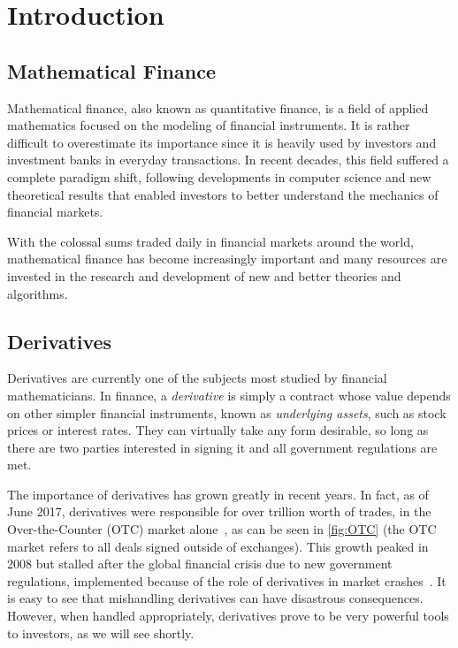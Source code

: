 \chapter{Introduction}
\label{chapter:introduction}
\section{Mathematical Finance}
\label{section:mathematical finance}
Mathematical finance, also known as quantitative finance, is a field of applied mathematics focused on the modeling of financial instruments.
It is rather difficult to overestimate its importance since it is heavily used by investors and investment banks in everyday transactions.
In recent decades, this field suffered a complete paradigm shift, following developments in computer science and new theoretical results that enabled investors to better understand the mechanics of financial markets.

With the colossal sums traded daily in financial markets around the world, mathematical finance has become increasingly important and many resources are invested in the research and development of new and better theories and algorithms.


\section{Derivatives}
\label{section:derivatives}
Derivatives are currently one of the subjects most studied by financial mathematicians.
In finance, a \emph{derivative} is simply a contract whose value depends on other simpler financial instruments, known as \emph{underlying assets}, such as stock prices or interest rates.
They can virtually take any form desirable, so long as there are two parties interested in signing it and all government regulations are met.


The importance of derivatives has grown greatly in recent years. In fact, as of June 2017, derivatives were responsible for over  trillion worth of trades, in the Over-the-Counter (OTC) market alone~\citep{BIS}, as can be seen in \autoref{fig:OTC} (the OTC market refers to all deals signed outside of exchanges).
This growth peaked in 2008 but stalled after the global financial crisis due to new government regulations, implemented because of the role of derivatives in market crashes~\citep{FT}. It is easy to see that mishandling derivatives can have disastrous consequences. However, when handled appropriately, derivatives prove to be very powerful tools to investors, as we will see shortly.


